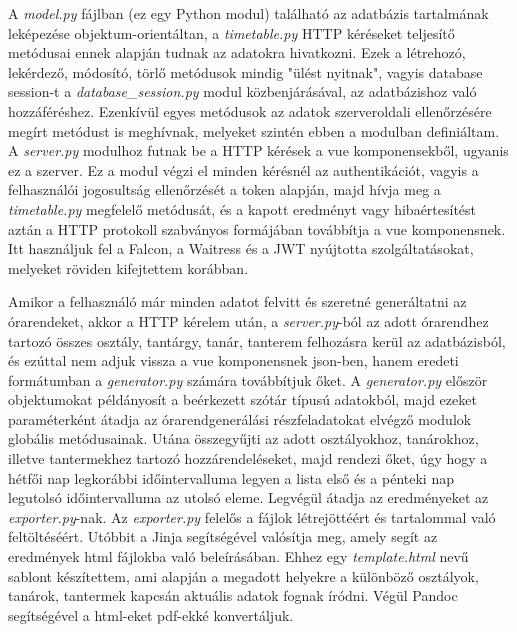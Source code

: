 \documentclass[12pt,a4paper]{report}
\begin{document}
A \textit{model.py} fájlban (ez egy Python modul) található az adatbázis tartalmának leképezése objektum-orientáltan, a \textit{timetable.py} HTTP kéréseket teljesítő metódusai ennek alapján tudnak az adatokra hivatkozni. Ezek a létrehozó, lekérdező, módosító, törlő metódusok mindig "ülést nyitnak", vagyis database session-t a \textit{database\_session.py} modul közbenjárásával, az adatbázishoz való hozzáféréshez. Ezenkívül egyes metódusok az adatok szerveroldali ellenőrzésére megírt metódust is meghívnak, melyeket szintén ebben a modulban definiáltam. A \textit{server.py} modulhoz futnak be a HTTP kérések a vue komponensekből, ugyanis ez a szerver. Ez a modul végzi el minden kérésnél az authentikációt, vagyis a felhasználói jogosultság ellenőrzését a token alapján, majd hívja meg a \textit{timetable.py} megfelelő metódusát, és a kapott eredményt vagy hibaértesítést aztán a HTTP protokoll szabványos formájában továbbítja a vue komponensnek. Itt használjuk fel a Falcon, a Waitress és a JWT nyújtotta szolgáltatásokat, melyeket röviden kifejtettem korábban.

Amikor a felhasználó már minden adatot felvitt és szeretné generáltatni az órarendeket, akkor a HTTP kérelem után, a \textit{server.py}-ból az adott órarendhez tartozó összes osztály, tantárgy, tanár, tanterem felhozásra kerül az adatbázisból, és ezúttal nem adjuk vissza a vue komponensnek json-ben, hanem eredeti formátumban a \textit{generator.py} számára továbbítjuk őket. A \textit{generator.py} először objektumokat példányosít a beérkezett szótár típusú adatokból, majd ezeket paraméterként átadja az órarendgenerálási részfeladatokat elvégző modulok globális metódusainak. Utána összegyűjti az adott osztályokhoz, tanárokhoz, illetve tantermekhez tartozó hozzárendeléseket, majd rendezi őket, úgy hogy a hétfői nap legkorábbi időintervalluma legyen a lista első és a pénteki nap legutolsó időintervalluma az utolsó eleme. Legvégül átadja az eredményeket az \textit{exporter.py}-nak. Az \textit{exporter.py} felelős a fájlok létrejöttéért és tartalommal való feltöltéséért. Utóbbit a Jinja segítségével valósítja meg, amely segít az eredmények html fájlokba való beleírásában. Ehhez egy \textit{template.html} nevű sablont készítettem, ami alapján a megadott helyekre a különböző osztályok, tanárok, tantermek kapcsán aktuális adatok fognak íródni. Végül Pandoc segítségével a html-eket pdf-ekké konvertáljuk.
\end{document}
